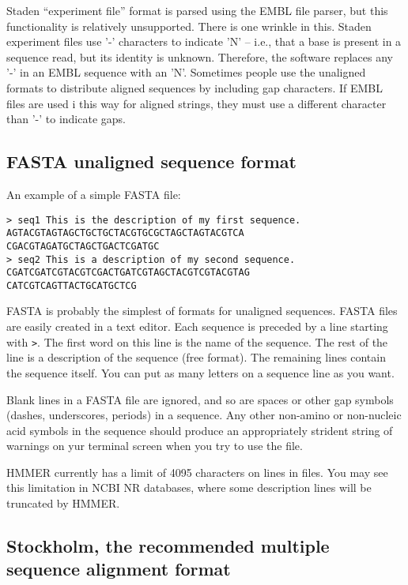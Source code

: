 Staden ``experiment file'' format is parsed using the EMBL file
parser, but this functionality is relatively unsupported. There is one
wrinkle in this. Staden experiment files use '-' characters to
indicate 'N' -- i.e., that a base is present in a sequence read, but
its identity is unknown. Therefore, the software replaces any '-' in
an EMBL sequence with an 'N'. Sometimes people use the unaligned
formats to distribute aligned sequences by including gap
characters. If EMBL files are used i this way for aligned strings,
they must use a different character than '-' to indicate gaps.

\subsection{FASTA unaligned sequence format}

An example of a simple FASTA file: 

\begin{verbatim}
> seq1 This is the description of my first sequence.
AGTACGTAGTAGCTGCTGCTACGTGCGCTAGCTAGTACGTCA
CGACGTAGATGCTAGCTGACTCGATGC
> seq2 This is a description of my second sequence.
CGATCGATCGTACGTCGACTGATCGTAGCTACGTCGTACGTAG
CATCGTCAGTTACTGCATGCTCG
\end{verbatim}

FASTA is probably the simplest of formats for unaligned sequences.
FASTA files are easily created in a text editor.  Each sequence is
preceded by a line starting with \verb+>+. The first word on this line
is the name of the sequence. The rest of the line is a description of
the sequence (free format). The remaining lines contain the sequence
itself. You can put as many letters on a sequence line as you want.

Blank lines in a FASTA file are ignored, and so are spaces or other
gap symbols (dashes, underscores, periods) in a sequence. Any other
non-amino or non-nucleic acid symbols in the sequence should produce
an appropriately strident string of warnings on yur terminal screen
when you try to use the file.

HMMER currently has a limit of 4095 characters on lines in files.  You
may see this limitation in NCBI NR databases, where some description
lines will be truncated by HMMER. 


\subsection{Stockholm, the recommended multiple sequence alignment format}

